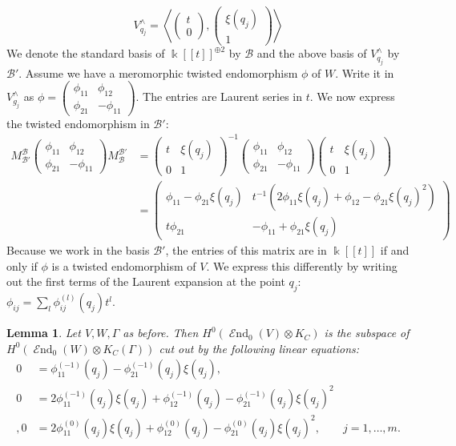 \documentclass[12pt]{extarticle}
\newtheorem{lemma}[theorem]{Lemma}
\theoremstyle{definition}
\numberwithin{theorem}{section}
\DeclareMathOperator{\End}{\mathcal{E}nd}
\begin{document}
\begin{equation*}
V^\wedge_{q_j} = \left\langle \begin{pmatrix}
t \\0
\end{pmatrix}, \begin{pmatrix}
\xi(q_j) \\ 1
\end{pmatrix} \right\rangle
\end{equation*}
We denote the standard basis of $\Bbbk[\![t]\!]^{\oplus 2}$ by $\mathcal{B}$ and the above basis of $V^\wedge_{q_j}$ by $\mathcal{B}'$. Assume we have a meromorphic twisted endomorphism $\phi$ of $W$. Write it in $V^\wedge_{g_j}$ as  ${\phi= \begin{pmatrix}
\phi_{11} & \phi_{12} \\
\phi_{21} & -\phi_{11}
\end{pmatrix}}$. The entries are Laurent series in $t$.
 We now express the twisted endomorphism in $\mathcal{B}'$:
\begin{align*}
M^\mathcal{B}_{\mathcal{B}'}\begin{pmatrix}
\phi_{11} & \phi_{12} \\
\phi_{21} & -\phi_{11}
\end{pmatrix}M^{\mathcal{B}'}_\mathcal{B} &= 
\begin{pmatrix}
t & \xi(q_j)\\
0 & 1
\end{pmatrix}^{-1}
\begin{pmatrix}
\phi_{11} & \phi_{12} \\
\phi_{21} & -\phi_{11}
\end{pmatrix}
\begin{pmatrix}
t & \xi(q_j) \\
0 & 1
\end{pmatrix} \\
&= \begin{pmatrix}
\phi_{11}-\phi_{21}\xi(q_j) & t^{-1}(2\phi_{11}\xi(q_j) +\phi_{12}-\phi_{21}\xi(q_j)^2) \\
t\phi_{21} & -\phi_{11}+\phi_{21}\xi(q_j)
\end{pmatrix}
\end{align*}
Because we work in the basis $\mathcal{B}'$, the entries of this matrix are in $\Bbbk[\![t]\!]$ if and only if $\phi$ is a twisted endomorphism of $V$. We express this differently by writing out the first terms of the Laurent expansion at the point $q_j$: $\phi_{ij} = \sum_l \phi_{ij}^{(l)}(q_j)t^l$. 
\begin{lemma}\label{lemma:key_eqs}
Let $V,W,\Gamma$ as before. Then $H^0(\End_0(V)\otimes K_C)$ is the subspace of $H^0(\End_0(W)\otimes K_C(\Gamma))$ cut out by the following linear equations:
\begin{align}\label{eq:coeff_vanishing_1}
0 &= \phi^{(-1)}_{11}(q_j)-\phi_{21}^{(-1)}(q_j)\xi(q_j), \\\label{eq:coeff_vanishing_2}
0 &= 2\phi^{(-1)}_{11}(q_j)\xi(q_j) + \phi^{(-1)}_{12}(q_j) - \phi^{(-1)}_{21}(q_j)\xi(q_j)^2 \\\label{eq:coeff_vanishing_3},
0 &= 2\phi^{(0)}_{11}(q_j)\xi(q_j) + \phi^{(0)}_{12}(q_j) - \phi_{21}^{(0)}(q_j)\xi(q_j)^2, \qquad j =1,\ldots,m.
\end{align}
\end{lemma} 
\end{document}
